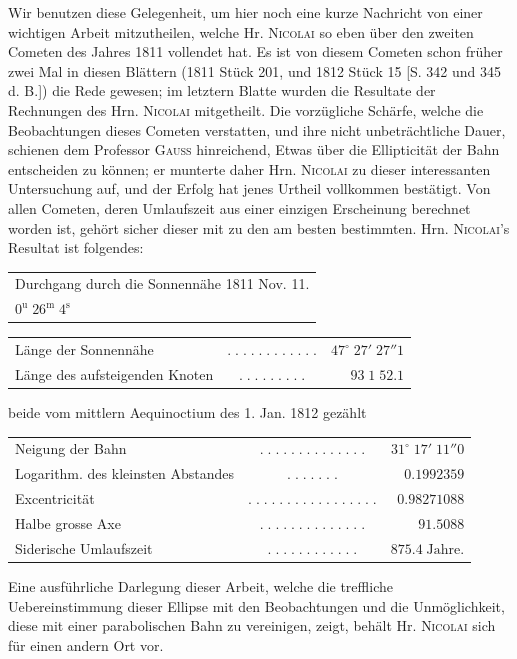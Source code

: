 \par\indent Wir benutzen diese Gelegenheit, um hier noch eine kurze Nachricht von einer wichtigen Arbeit
mitzutheilen, welche Hr. \textsc{Nicolai} so eben über den zweiten Cometen des Jahres 1811 vollendet hat.
Es ist von diesem Cometen schon früher zwei Mal in diesen Blättern (1811 Stück 201, und 1812
Stück 15 [S. 342 und 345 d. B.]) die Rede gewesen; im letztern Blatte wurden die Resultate der
Rechnungen des Hrn. \textsc{Nicolai} mitgetheilt. Die vorzügliche Schärfe, welche die Beobachtungen dieses
Cometen verstatten, und ihre nicht unbeträchtliche Dauer, schienen dem Professor \textsc{Gauss} hinreichend,
Etwas über die Ellipticität der Bahn entscheiden zu können; er munterte daher Hrn. \textsc{Nicolai} zu
dieser interessanten Untersuchung auf, und der Erfolg hat jenes Urtheil vollkommen bestätigt. Von
allen Cometen, deren Umlaufszeit aus einer einzigen Erscheinung berechnet worden ist, gehört sicher
dieser mit zu den am besten bestimmten. Hrn. \textsc{Nicolai}'s Resultat ist folgendes:

\medskip
\begin{center}\fontsize{10}{12}\selectfont\setlength{\tabcolsep}{2pt}\renewcommand{\arraystretch}{1.15}\begin{tabular}{l}
Durchgang durch die Sonnennähe 1811 Nov. 11.\\$0^{\mathrm u}\;26^{\mathrm m}\;4^{\mathrm s}$
\end{tabular}\end{center}
\begin{center}\fontsize{9}{11}\selectfont\setlength{\tabcolsep}{2pt}\renewcommand{\arraystretch}{1.15}\begin{tabular}{lcr}
Länge der Sonnennähe & $.\;.\;.\;.\;.\;.\;.\;.\;.\;.\;.\;.$ & $47^\circ\;27'\;27''1$\\
Länge des aufsteigenden Knoten & $.\;.\;.\;.\;.\;.\;.\;.\;.$ & $93\;1\;52.1$\\
\end{tabular}\end{center}
\noindent beide vom mittlern Aequinoctium des 1. Jan. 1812 gezählt
\begin{center}\fontsize{9}{11}\selectfont\setlength{\tabcolsep}{2pt}\renewcommand{\arraystretch}{1.15}\begin{tabular}{lcr}
Neigung der Bahn & $.\;.\;.\;.\;.\;.\;.\;.\;.\;.\;.\;.\;.\;.$ & $31^\circ\;17'\;11''0$\\
Logarithm. des kleinsten Abstandes & $.\;.\;.\;.\;.\;.\;.$ & $0.1992359$\\
Excentricität & $.\;.\;.\;.\;.\;.\;.\;.\;.\;.\;.\;.\;.\;.\;.\;.\;.$ & $0.98271088$\\
Halbe grosse Axe & $.\;.\;.\;.\;.\;.\;.\;.\;.\;.\;.\;.\;.\;.$ & $91.5088$\\
Siderische Umlaufszeit & $.\;.\;.\;.\;.\;.\;.\;.\;.\;.\;.\;.$ & $875.4\;\text{Jahre.}$\\
\end{tabular}\end{center}

\par\indent Eine ausführliche Darlegung dieser Arbeit, welche die treffliche Uebereinstimmung dieser Ellipse mit
den Beobachtungen und die Unmöglichkeit, diese mit einer parabolischen Bahn zu vereinigen, zeigt,
behält Hr. \textsc{Nicolai} sich für einen andern Ort vor.
